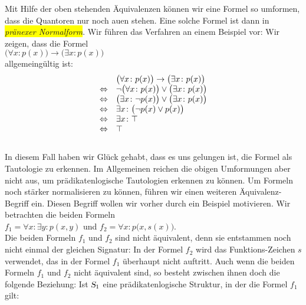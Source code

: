 Mit Hilfe der oben stehenden \"{A}quivalenzen k\"{o}nnen wir eine Formel so umformen, dass die Quantoren nur
noch au\3en stehen.  Eine solche Formel ist dann in \colorbox{yellow}{\emph{pr\"{a}nexer Normalform}}.  Wir f\"{u}hren
das Verfahren an einem Beispiel vor: Wir zeigen, dass die Formel 
\\[0.2cm]
\hspace*{1.3cm}
$\big(\forall x\colon p(x)\big) \rightarrow \big(\exists x\colon p(x)\big)$ 
\\[0.2cm]
allgemeing\"{u}ltig ist: 
$$ 
\begin{array}{ll}
                 & \big(\forall x\colon p(x)\big) \rightarrow \big(\exists x\colon p(x)\big)  \\
 \Leftrightarrow & \neg \big(\forall x\colon p(x)\big) \vee \big(\exists x\colon p(x)\big)    \\
 \Leftrightarrow & \big(\exists x\colon \neg p(x)\big) \vee \big(\exists x\colon p(x)\big)    \\
 \Leftrightarrow & \exists x\colon \bigl(\neg p(x) \vee p(x)\bigr) \\
 \Leftrightarrow & \exists x\colon \top                                                  \\
 \Leftrightarrow & \top                                                  \\
\end{array}
$$
\\[0.2cm]
In diesem Fall haben wir Gl\"{u}ck gehabt, dass es uns gelungen ist, die Formel als Tautologie zu
erkennen.  Im Allgemeinen reichen die obigen Umformungen aber nicht aus, um pr\"{a}dikatenlogische
Tautologien erkennen zu k\"{o}nnen.
Um Formeln noch st\"{a}rker normalisieren zu k\"{o}nnen, 
f\"{u}hren wir einen weiteren
\"{A}quivalenz-Begriff ein.  Diesen Begriff wollen wir vorher durch ein Beispiel motivieren.
Wir betrachten die beiden Formeln \\[0.2cm]
\hspace*{1.3cm} $f_1 = \forall x \colon \exists y \colon p(x,y)$ \quad und \quad $f_2 = \forall x \colon p\bigl(x,s(x)\bigr)$.\\[0.2cm]
Die beiden Formeln $f_1$ und $f_2$ sind nicht \"{a}quivalent, denn sie entstammen noch nicht
einmal der gleichen Signatur: In der Formel $f_2$ wird das Funktions-Zeichen $s$
verwendet, das in der Formel $f_1$ \"{u}berhaupt nicht auftritt. 
Auch wenn die beiden Formeln $f_1$ und $f_2$ nicht \"{a}quivalent sind, so besteht zwischen
ihnen doch die folgende Beziehung:  Ist $\textsl{S}_1$ eine
pr\"{a}dikatenlogische Struktur, in der die Formel $f_1$ gilt:
